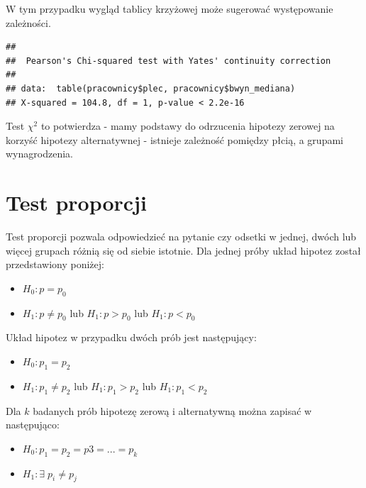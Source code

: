 \documentclass[]{book}
\newenvironment{Shaded}{\begin{snugshade}}{\end{snugshade}}
\newcommand{\KeywordTok}[1]{\textcolor[rgb]{0.13,0.29,0.53}{\textbf{#1}}}
\newcommand{\NormalTok}[1]{#1}
\newcommand{\OperatorTok}[1]{\textcolor[rgb]{0.81,0.36,0.00}{\textbf{#1}}}
\providecommand{\tightlist}{%
  \setlength{\itemsep}{0pt}\setlength{\parskip}{0pt}}
\begin{document}
W tym przypadku wygląd tablicy krzyżowej może sugerować występowanie zależności.

\begin{Shaded}
\end{Shaded}

\begin{verbatim}
## 
##  Pearson's Chi-squared test with Yates' continuity correction
## 
## data:  table(pracownicy$plec, pracownicy$bwyn_mediana)
## X-squared = 104.8, df = 1, p-value < 2.2e-16
\end{verbatim}

Test \(\chi^2\) to potwierdza - mamy podstawy do odrzucenia hipotezy zerowej na korzyść hipotezy alternatywnej - istnieje zależność pomiędzy płcią, a grupami wynagrodzenia.

\hypertarget{test-proporcji}{%
\section{Test proporcji}\label{test-proporcji}}

Test proporcji pozwala odpowiedzieć na pytanie czy odsetki w jednej, dwóch lub więcej grupach różnią się od siebie istotnie. Dla jednej próby układ hipotez został przedstawiony poniżej:

\begin{itemize}
\tightlist
\item
  \(H_0: p=p_0\)
\item
  \(H_1: p \neq p_0\) lub \(H_1: p > p_0\) lub \(H_1: p < p_0\)
\end{itemize}

Układ hipotez w przypadku dwóch prób jest następujący:

\begin{itemize}
\tightlist
\item
  \(H_0: p_1=p_2\)
\item
  \(H_1: p_1 \neq p_2\) lub \(H_1: p_1 > p_2\) lub \(H_1: p_1 < p_2\)
\end{itemize}

Dla \(k\) badanych prób hipotezę zerową i alternatywną można zapisać w następująco:

\begin{itemize}
\tightlist
\item
  \(H_0: p_1=p_2=p3=...=p_k\)
\item
  \(H_1: \exists \; p_i \neq p_j\)
\end{itemize}
\end{document}
